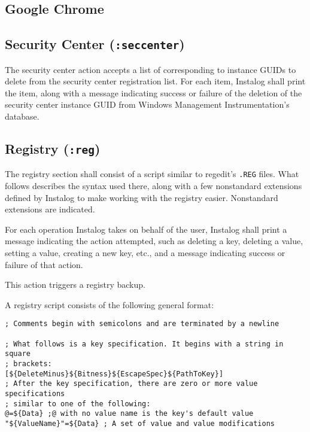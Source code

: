 \subsection{Google Chrome}

\subsection{Security Center (\texttt{:seccenter})}
The security center action accepts a list of  corresponding to
instance GUIDs to delete from the security center registration list. For each
item, Instalog shall print the item, along with a message indicating success or
failure of the deletion of the security center instance GUID from Windows
Management Instrumentation's database.

\subsection{Registry (\texttt{:reg})}
The registry section shall consist of a script similar to regedit's \verb|.REG|
files. What follows describes the syntax used there, along with a few
nonstandard extensions defined by Instalog to make working with the registry
easier. Nonstandard extensions are indicated.

For each operation Instalog takes on behalf of the user, Instalog shall print a
message indicating the action attempted, such as deleting a key, deleting a
value, setting a value, creating a new key, etc., and a message indicating
success or failure of that action.

This action triggers a registry backup.

A registry script consists of the following general format:
\begin{verbatim}
; Comments begin with semicolons and are terminated by a newline

; What follows is a key specification. It begins with a string in square
; brackets:
[${DeleteMinus}${Bitness}${EscapeSpec}${PathToKey}]
; After the key specification, there are zero or more value specifications
; similar to one of the following:
@=${Data} ;@ with no value name is the key's default value
"${ValueName}"=${Data} ; A set of value and value modifications
\end{verbatim}

